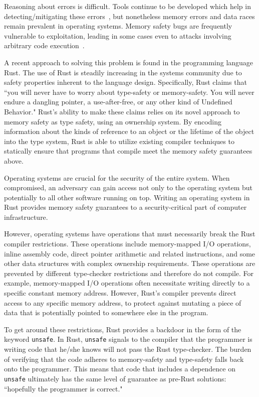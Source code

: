 \documentclass[12pt]{article}
\begin{document}
Reasoning about errors is difficult. Tools continue to be developed which help in detecting/mitigating these errors~\cite{criswell2009memory, kuvaiskii2017sgxbounds, seyster2011redflag}, but nonetheless memory errors and data races remain prevalent in operating systems. Memory safety bugs are frequently vulnerable to exploitation, leading in some cases even to attacks involving arbitrary code execution~\cite{android_vulnerabilities, shacham2007geometry}.

A recent approach to solving this problem is found in the programming language Rust. The use of Rust is steadily increasing in the systems community due to safety properties inherent to the language design. Specifically, Rust claims that
``you will never have to worry about type-safety or memory-safety. You will never endure a dangling pointer, a use-after-free, or any other kind of Undefined Behavior."\cite{rust_nomicon}
Rust's ability to make these claims relies on its novel approach to memory safety as type safety, using an ownership system. By encoding information about the kinds of reference to an object or the lifetime of the object into the type system, Rust is able to utilize existing compiler techniques to statically ensure that programs that compile meet the memory safety guarantees above.

Operating systems are crucial for the security of the entire system. When compromised, an adversary can gain access not only to the operating system but potentially to all other software running on top. Writing an operating system in Rust provides memory safety guarantees to a security-critical part of computer infrastructure.

However, operating systems have operations that must necessarily break the Rust compiler restrictions. These operations include memory-mapped I/O operations, inline assembly code, direct pointer arithmetic and related instructions, and some other data structures with complex ownership requirements. These operations are prevented by different type-checker restrictions and therefore do not compile. For example, memory-mapped I/O operations often necessitate writing directly to a specific constant memory address. However, Rust's compiler prevents direct access to any specific memory address, to protect against mutating a piece of data that is potentially pointed to somewhere else in the program.

To get around these restrictions, Rust provides a backdoor in the form of the keyword \texttt{unsafe}. In Rust, \texttt{unsafe} signals to the compiler that the programmer is writing code that he/she knows will not pass the Rust type-checker. The burden of verifying that the code adheres to memory-safety and type-safety falls back onto the programmer. This means that code that includes a dependence on \texttt{unsafe} ultimately has the same level of guarantee as pre-Rust solutions: ``hopefully the programmer is correct."
\end{document}
